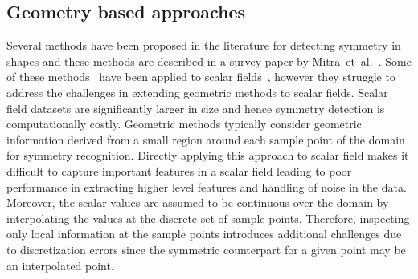 \documentclass[review,journal]{vgtc}         %
\begin{document}
\subsection{Geometry based approaches}
Several methods have been proposed in the literature for detecting
symmetry in shapes and these methods are described in a survey paper by
Mitra~et~al.~\cite{MitPWC2012}. Some of these methods~\cite{Mitra06,KazhdanCDFR03,BokBWSS09} have 
been applied to scalar fields~\cite{MasoodTN13,HongS08,kerbWKS11}, however they struggle to address 
the challenges in extending geometric methods to scalar fields.
Scalar field datasets are significantly larger in size and hence symmetry detection is computationally costly.
Geometric methods typically consider geometric information derived from a small region around each sample
point of the domain for symmetry recognition. Directly applying this approach to scalar field makes it difficult 
to capture important features in a scalar field leading to poor performance in extracting higher level
features and handling of noise in the data.
Moreover, the scalar values are assumed to be continuous over the domain by interpolating the values at 
the discrete set of sample points. Therefore, inspecting only local information at the sample points
introduces additional challenges due to discretization errors since the symmetric counterpart for a 
given point may be an interpolated point.
\end{document}
